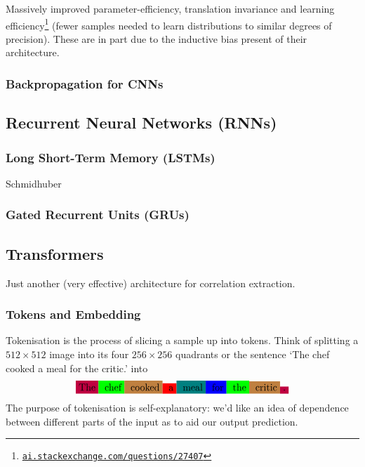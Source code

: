 \documentclass[11pt]{article}
\begin{document}
\begin{tcolorbox}[title={\centering\textbf{Why use a CNN over an MLP?}}, colback=myLightBlue, colbacktitle=myDarkBlue, colframe=myDarkBlue, coltitle=white]
    Massively improved parameter-efficiency, translation invariance and learning efficiency\footnote{\href{https://ai.stackexchange.com/questions/27407/what-does-statistical-efficiency-mean-in-this-context}{\texttt{ai.stackexchange.com/questions/27407}}} (fewer samples needed to learn distributions to similar degrees of precision). These are in part due to the inductive bias present of their architecture.
\end{tcolorbox}

\subsubsection{\TODO Backpropagation for CNNs}

\subsection{\TODO Recurrent Neural Networks (RNNs)}

\subsubsection{Long Short-Term Memory (LSTMs)}
Schmidhuber

\subsubsection{Gated Recurrent Units (GRUs)}

\subsection{\TODO Transformers}
Just another (very effective) architecture for correlation extraction.

\subsubsection{Tokens and Embedding}
Tokenisation is the process of slicing a sample up into tokens. Think of splitting a $512\times512$ image into its four $256\times256$ quadrants or the sentence `The chef cooked a meal for the critic.' into
$$
\colorbox{purple}{The}\colorbox{green}{ chef}\colorbox{brown}{ cooked}\colorbox{red}{ a}\colorbox{teal}{ meal}\colorbox{blue}{ for}\colorbox{green}{ the}\colorbox{brown}{ critic}\colorbox{purple}{.}
$$
The purpose of tokenisation is self-explanatory: we'd like an idea of dependence between different parts of the input as to aid our output prediction.
\end{document}
